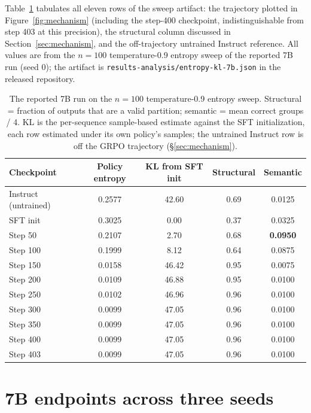 \documentclass{article}
\begin{document}
Table~\ref{tab:ckpt} tabulates all eleven rows of the sweep artifact: the
trajectory plotted in Figure~\ref{fig:mechanism} (including the step-400
checkpoint, indistinguishable from step 403 at this precision), the
structural column discussed in Section~\ref{sec:mechanism}, and the
off-trajectory untrained Instruct reference. All values are from the $n=100$
temperature-0.9
entropy sweep of the reported 7B run (seed 0); the artifact is
\texttt{results-analysis/entropy-kl-7b.json} in the released repository.

\begin{table}[h]
\centering
\caption{The reported 7B run on the $n=100$ temperature-0.9 entropy sweep.
Structural = fraction of outputs that are a valid partition; semantic = mean
correct groups / 4. KL is the per-sequence sample-based estimate against the
SFT initialization, each row estimated under its own policy's samples; the
untrained Instruct row is off the GRPO trajectory
(\S\ref{sec:mechanism}).}
\label{tab:ckpt}
\begin{tabular}{lcccc}
\toprule
Checkpoint & Policy entropy & KL from SFT init & Structural & Semantic \\
\midrule
Instruct (untrained) & 0.2577 & 42.60 & 0.69 & 0.0125 \\
\midrule
SFT init  & 0.3025 & 0.00  & 0.37 & 0.0325 \\
Step 50   & 0.2107 & 2.70  & 0.68 & \textbf{0.0950} \\
Step 100  & 0.1999 & 8.12  & 0.64 & 0.0875 \\
Step 150  & 0.0158 & 46.42 & 0.95 & 0.0075 \\
Step 200  & 0.0109 & 46.88 & 0.95 & 0.0100 \\
Step 250  & 0.0102 & 46.96 & 0.96 & 0.0100 \\
Step 300  & 0.0099 & 47.05 & 0.96 & 0.0100 \\
Step 350  & 0.0099 & 47.05 & 0.96 & 0.0100 \\
Step 400  & 0.0099 & 47.05 & 0.96 & 0.0100 \\
Step 403  & 0.0099 & 47.05 & 0.96 & 0.0100 \\
\bottomrule
\end{tabular}
\end{table}

\section{7B endpoints across three seeds}
\label{app:endpoints}
\end{document}
